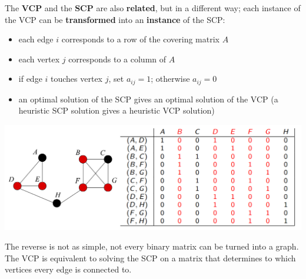\documentclass[11pt]{article}
\begin{document}
	The \textbf{VCP} and the \textbf{SCP} are also \textbf{related}, but in a different way; each instance of the VCP can be \textbf{transformed} into an \textbf{instance} of the SCP:
	\begin{itemize}
		\item each edge $i$ corresponds to a row of the covering matrix $A$
		\item each vertex $j$ corresponds to a column of $A$
		\item if edge $i$ touches vertex $j$, set $a_{ij} = 1$; otherwise $a_{ij} = 0$
		\item an optimal solution of the SCP gives an optimal solution of the VCP (a heuristic SCP solution gives a heuristic VCP solution)
	\end{itemize}
	\begin{center}
		\includegraphics[width=\columnwidth]{img/interlude52}
	\end{center}
	The reverse is not as simple, not every binary matrix can be turned into a graph.\\
	
	The VCP is equivalent to solving the SCP on a matrix that determines to which vertices every edge is connected to.\\
	
	\newpage
	
\end{document}
